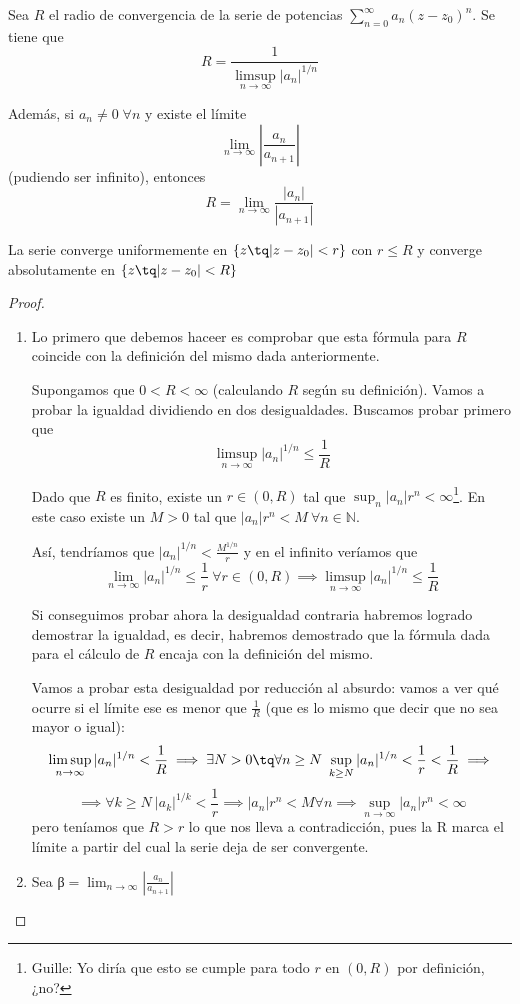 \documentclass{apuntes}
\begin{document}
\begin{theorem}
Sea $R$ el radio de convergencia de la serie de potencias $\sum_{n=0}^{\infty} a_n (z-z_0)^n$. Se tiene que \[R = \frac{1}{\limsup_{n \to \infty} |a_n|^{1/n}}\]

Además, si $a_n \neq 0\; \forall n$ y existe el límite \[ \lim_{n \to \infty} \left|\frac{a_n}{a_{n+1}}\right|\] (pudiendo ser infinito), entonces \[ R = \lim_{n \to \infty}\frac{|a_n|}{|a_{n+1}|}\]

La serie converge uniformemente en $\{z \tq |z-z_0| < r\}$ con $r \leq R$ y converge absolutamente en $\{z \tq |z-z_0|<R\}$
\end{theorem}
\begin{proof}

\begin{enumerate}
\item Lo primero que debemos haceer es comprobar que esta fórmula para $R$ coincide con la definición del mismo dada anteriormente.

Supongamos que $0<R<\infty$ (calculando $R$ según su definición). Vamos a probar la igualdad dividiendo en dos desigualdades. Buscamos probar primero que
\[\limsup_{n \to \infty} |a_n|^{1/n} \leq \frac{1}{R}\]

Dado que $R$ es finito, existe un $r∈(0,R)$ tal que $\sup_n |a_n| r^n <\infty$\footnote{Guille: Yo diría que esto se cumple para todo $r$ en $(0,R)$ por definición, ¿no?}. En este caso existe un $M>0$ tal que $|a_n|r^n < M \ \forall n ∈ ℕ$.

Así, tendríamos que $|a_n|^{1/n} < \frac{M^{1/n}}{r}$ y en el infinito veríamos que
\[\lim_{n \to \infty} |a_n|^{1/n} \leq \frac{1}{r} \ \forall r ∈ (0,R) \implies \limsup_{n \to \infty}|a_n|^{1/n} \leq \frac{1}{R}\]

Si conseguimos probar ahora la desigualdad contraria habremos logrado demostrar la igualdad, es decir, habremos demostrado que la fórmula dada para el cálculo de $R$ encaja con la definición del mismo.

Vamos a probar esta desigualdad por reducción al absurdo: vamos a ver qué ocurre si el límite ese es menor que $\frac{1}{R}$ (que es lo mismo que decir que no sea mayor o igual):
\[\limsup_{n \to \infty}|a_n|^{1/n} < \frac{1}{R} \implies \exists N > 0 \tq \forall n \geq N \ \sup_{k \geq N} |a_n|^{1/n} < \frac{1}{r} < \frac{1}{R} \implies\]
\[\implies \forall k \geq N \ |a_k|^{1/k} < \frac{1}{r} \implies |a_n| r^n < M \forall n \implies \sup_{n\to\infty}|a_n|r^n< \infty\]
pero teníamos que $R > r$ lo que nos lleva a contradicción, pues la R marca el límite a partir del cual la serie deja de ser convergente.
\item
Sea β$= \lim_{n \to \infty}\left|\frac{a_n}{a_{n+1}} \right|$


\end{enumerate}
\end{proof}
\end{document}
